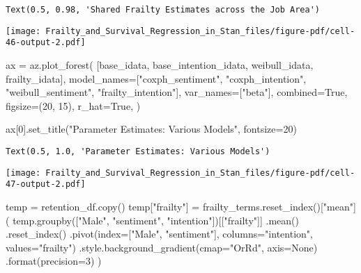 \documentclass[
  letterpaper,
  DIV=11,
  numbers=noendperiod]{scrartcl}
\newenvironment{Shaded}{\begin{snugshade}}{\end{snugshade}}
\newcommand{\BuiltInTok}[1]{\textcolor[rgb]{0.00,0.23,0.31}{#1}}
\newcommand{\DecValTok}[1]{\textcolor[rgb]{0.68,0.00,0.00}{#1}}
\newcommand{\NormalTok}[1]{\textcolor[rgb]{0.00,0.23,0.31}{#1}}
\newcommand{\OperatorTok}[1]{\textcolor[rgb]{0.37,0.37,0.37}{#1}}
\newcommand{\StringTok}[1]{\textcolor[rgb]{0.13,0.47,0.30}{#1}}
\newcommand{\VariableTok}[1]{\textcolor[rgb]{0.07,0.07,0.07}{#1}}
\begin{document}
\begin{verbatim}
Text(0.5, 0.98, 'Shared Frailty Estimates across the Job Area')
\end{verbatim}

\texttt{[image: Frailty\_and\_Survival\_Regression\_in\_Stan\_files/figure-pdf/cell-46-output-2.pdf]}

\begin{Shaded}
\begin{Highlighting}[]
\NormalTok{ax }\OperatorTok{=}\NormalTok{ az.plot\_forest(}
\NormalTok{    [base\_idata, base\_intention\_idata, weibull\_idata, frailty\_idata],}
\NormalTok{    model\_names}\OperatorTok{=}\NormalTok{[}\StringTok{"coxph\_sentiment"}\NormalTok{, }\StringTok{"coxph\_intention"}\NormalTok{, }\StringTok{"weibull\_sentiment"}\NormalTok{, }\StringTok{"frailty\_intention"}\NormalTok{],}
\NormalTok{    var\_names}\OperatorTok{=}\NormalTok{[}\StringTok{"beta"}\NormalTok{],}
\NormalTok{    combined}\OperatorTok{=}\VariableTok{True}\NormalTok{,}
\NormalTok{    figsize}\OperatorTok{=}\NormalTok{(}\DecValTok{20}\NormalTok{, }\DecValTok{15}\NormalTok{),}
\NormalTok{    r\_hat}\OperatorTok{=}\VariableTok{True}\NormalTok{,}
\NormalTok{)}

\NormalTok{ax[}\DecValTok{0}\NormalTok{].set\_title(}\StringTok{"Parameter Estimates: Various Models"}\NormalTok{, fontsize}\OperatorTok{=}\DecValTok{20}\NormalTok{)}
\end{Highlighting}
\end{Shaded}

\begin{verbatim}
Text(0.5, 1.0, 'Parameter Estimates: Various Models')
\end{verbatim}

\texttt{[image: Frailty\_and\_Survival\_Regression\_in\_Stan\_files/figure-pdf/cell-47-output-2.pdf]}

\begin{Shaded}
\begin{Highlighting}[]
\NormalTok{temp }\OperatorTok{=}\NormalTok{ retention\_df.copy()}
\NormalTok{temp[}\StringTok{"frailty"}\NormalTok{] }\OperatorTok{=}\NormalTok{ frailty\_terms.reset\_index()[}\StringTok{"mean"}\NormalTok{]}
\NormalTok{(}
\NormalTok{    temp.groupby([}\StringTok{"Male"}\NormalTok{, }\StringTok{"sentiment"}\NormalTok{, }\StringTok{"intention"}\NormalTok{])[[}\StringTok{"frailty"}\NormalTok{]]}
\NormalTok{    .mean()}
\NormalTok{    .reset\_index()}
\NormalTok{    .pivot(index}\OperatorTok{=}\NormalTok{[}\StringTok{"Male"}\NormalTok{, }\StringTok{"sentiment"}\NormalTok{], columns}\OperatorTok{=}\StringTok{"intention"}\NormalTok{, values}\OperatorTok{=}\StringTok{"frailty"}\NormalTok{)}
\NormalTok{    .style.background\_gradient(cmap}\OperatorTok{=}\StringTok{"OrRd"}\NormalTok{, axis}\OperatorTok{=}\VariableTok{None}\NormalTok{)}
\NormalTok{    .}\BuiltInTok{format}\NormalTok{(precision}\OperatorTok{=}\DecValTok{3}\NormalTok{)}
\NormalTok{)}
\end{Highlighting}
\end{Shaded}
\end{document}
